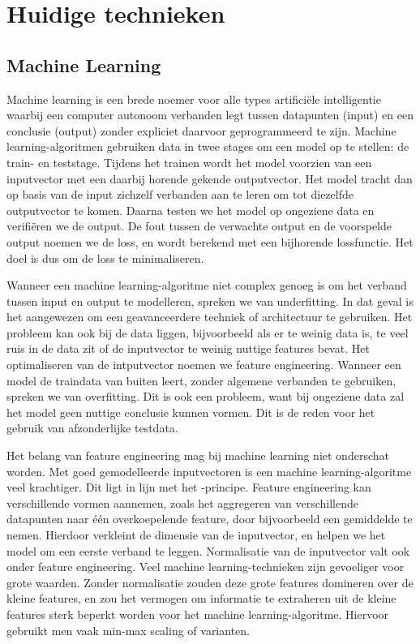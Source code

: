 \chapter{Huidige technieken}
\label{sec:chapt2}

\section{Machine Learning}
\label{sec:chapt2_machine_learning}
Machine learning is een brede noemer voor alle types artificiële intelligentie waarbij een computer autonoom verbanden legt tussen datapunten (input) en een conclusie (output) zonder expliciet daarvoor geprogrammeerd te zijn. \cite{ml_textbook} Machine learning-algoritmen gebruiken data in twee stages om een model op te stellen: de train- en teststage. Tijdens het trainen wordt het model voorzien van een inputvector met een daarbij horende gekende outputvector. Het model tracht dan op basis van de input zichzelf verbanden aan te leren om tot diezelfde outputvector te komen. Daarna testen we het model op ongeziene data en verifiëren we de output. De fout tussen de verwachte output en de voorspelde output noemen we de loss, en wordt berekend met een bijhorende lossfunctie. Het doel is dus om de loss te minimaliseren.

Wanneer een machine learning-algoritme niet complex genoeg is om het verband tussen input en output te modelleren, spreken we van underfitting. In dat geval is het aangewezen om een geavanceerdere techniek of architectuur te gebruiken. Het probleem kan ook bij de data liggen, bijvoorbeeld als er te weinig data is, te veel ruis in de data zit of de inputvector te weinig nuttige features bevat. Het optimaliseren van de intputvector noemen we feature engineering. Wanneer een model de traindata van buiten leert, zonder algemene verbanden te gebruiken, spreken we van overfitting. Dit is ook een probleem, want bij ongeziene data zal het model geen nuttige conclusie kunnen vormen. Dit is de reden voor het gebruik van afzonderlijke testdata. \cite{overfitting_underfitting}


Het belang van feature engineering mag bij machine learning niet onderschat worden. Met goed gemodelleerde inputvectoren is een machine learning-algoritme veel krachtiger. Dit ligt in lijn met het -principe. \cite{feature_engineering_ml} Feature engineering kan verschillende vormen aannemen, zoals het aggregeren van verschillende datapunten naar één overkoepelende feature, door bijvoorbeeld een gemiddelde te nemen. Hierdoor verkleint de dimensie van de inputvector, en helpen we het model om een eerste verband te leggen. Normalisatie van de inputvector valt ook onder feature engineering. Veel machine learning-technieken zijn gevoeliger voor grote waarden. Zonder normalisatie zouden deze grote features domineren over de kleine features, en zou het vermogen om informatie te extraheren uit de kleine features sterk beperkt worden voor het machine learning-algoritme. Hiervoor gebruikt men vaak min-max scaling of varianten.

